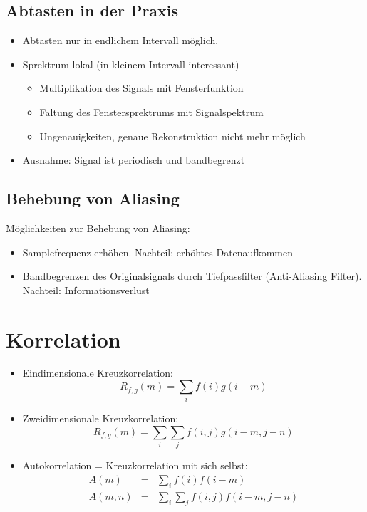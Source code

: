 \subsection{Abtasten in der Praxis}
\begin{itemize}
\item Abtasten nur in endlichem Intervall möglich.
\item Sprektrum lokal (in kleinem Intervall interessant)
\begin{itemize}
\item Multiplikation des Signals mit Fensterfunktion
\item Faltung des Fenstersprektrums mit Signalspektrum
\item Ungenauigkeiten, genaue Rekonstruktion nicht mehr möglich
\end{itemize}
\item Ausnahme: Signal ist periodisch und bandbegrenzt
\end{itemize}

\subsection{Behebung von Aliasing}
Möglichkeiten zur Behebung von Aliasing:
\begin{itemize}
\item Samplefrequenz erhöhen. Nachteil: erhöhtes Datenaufkommen
\item Bandbegrenzen des Originalsignals durch Tiefpassfilter (Anti-Aliasing Filter). Nachteil: Informationsverlust
\end{itemize}

\section{Korrelation}
\begin{itemize}
\item Eindimensionale Kreuzkorrelation: $$R_{f,g}(m) = \sum\limits_{i} f(i) g(i - m)$$
\item Zweidimensionale Kreuzkorrelation: $$R_{f,g}(m) = \sum\limits_i \sum\limits_j f(i,j) g(i-m,j-n)$$
\item Autokorrelation = Kreuzkorrelation mit sich selbst:
\begin{eqnarray*}
A(m) &=& \sum\limits_i f(i) f(i-m) \\ A(m,n) &=& \sum\limits_i \sum\limits_j f(i,j) f(i-m,j-n)
\end{eqnarray*}
\end{itemize}

